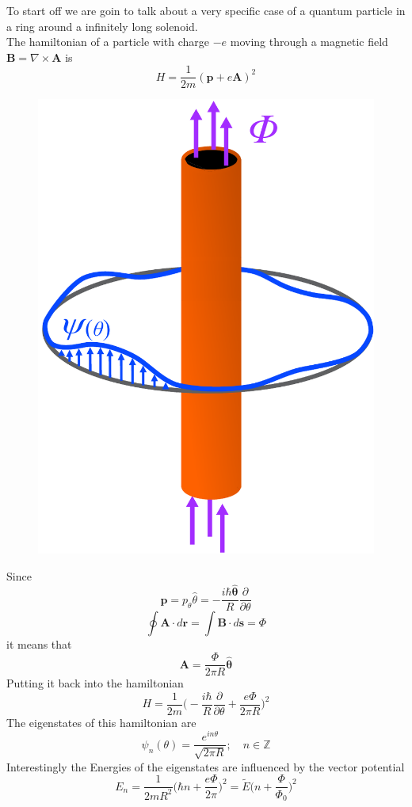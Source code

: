         
        To start off we are goin to talk about a very specific case of a quantum particle in a ring around a infinitely long solenoid.\\
        The hamiltonian of a particle with charge $-e$ moving through a magnetic field $\mathbf B= \nabla \times \mathbf A$ is
        \begin{equation} \label{EMHamiltonian}
                H=\frac 1{2m}(\mathbf p + e\mathbf A)^2 
        \end{equation}
        \begin{figure}
            \includegraphics[width=.4\textwidth]{Immagini/topo/solenoid.pdf}
        \end{figure} 
        Since 
        \[\mathbf p=p_\theta \hat\theta=-\frac{i\hbar\mathbf {\hat \theta}}{R}\frac\partial {\partial \theta}\]
        \[
            \oint \mathbf A\cdot d\mathbf r=\int \mathbf B\cdot d\mathbf s = \Phi
        \]   
        it means that
        \begin{equation} \label{vector_potential}
            \mathbf A=\frac \Phi{2\pi R} \mathbf {\hat \theta}
        \end{equation}
        Putting it back into the hamiltonian
        \begin{equation} \label{EMHamiltonian2}
            H=\frac 1{2m}\bigg(-\frac{i\hbar}{R}\frac\partial {\partial \theta} + \frac{e\Phi}{2\pi R}\bigg)^2 
        \end{equation}
        The eigenstates of this hamiltonian are 
        \[
        \psi_n(\theta)=\frac {e^{in\theta}} {\sqrt{2\pi R}}; \quad n\in \mathbb Z
        \]
        Interestingly the Energies of the eigenstates are influenced by the vector potential
        \begin{equation} \label{spectral_flow}
                E_n=\frac 1{2mR^2}\bigg(\hbar n+ \frac{e\Phi}{2\pi}\bigg)^2=\tilde E\bigg(n+\frac{\Phi}{\Phi_0}\bigg)^2
        \end{equation}
